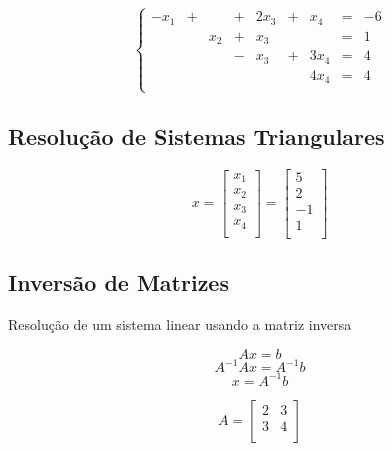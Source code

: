 \documentclass[a4paper]{article}
\begin{document}
\begin{displaymath}
  \left\{\begin{array}{ccccccccc}
      -x_1 &+&  &+& 2x_3 &+& x_4 &=&-6 \\
      && x_2 &+& x_3 && &=& 1\\
      && &-&x_3 &+& 3x_4 &=&4\\
      &&&&&&4x_4 &=& 4\\
    \end{array}
  \right.
\end{displaymath}

\subsection*{Resolução de Sistemas Triangulares}

\begin{displaymath}
  x=
  \begin{bmatrix}
    x_1\\
    x_2\\
    x_3\\
    x_4\\
  \end{bmatrix}
  =
\begin{bmatrix}
    5\\
    2\\
    -1\\
    1\\
  \end{bmatrix}
\end{displaymath}


\subsection*{Inversão de Matrizes}

Resolução de um sistema linear usando a matriz inversa

\begin{displaymath}
  Ax=b
\end{displaymath}
\begin{displaymath}
  A^{-1}Ax=A^{-1}b
\end{displaymath}
\begin{displaymath}
  x=A^{-1}b
\end{displaymath}


\begin{displaymath}
  A=\begin{bmatrix}
  2&3\\
  3&4\\
  \end{bmatrix}
\end{displaymath}
\end{document}

